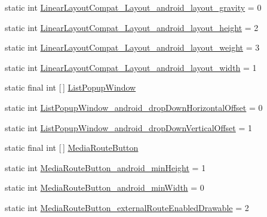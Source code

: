 \begin{DoxyCompactItemize}
\item 
static int \hyperlink{classandroid_1_1support_1_1v7_1_1mediarouter_1_1R_1_1styleable_aa6fdf2458c85c1826fa468547aaf9215}{Linear\+Layout\+Compat\+\_\+\+Layout\+\_\+android\+\_\+layout\+\_\+gravity} = 0
\item 
static int \hyperlink{classandroid_1_1support_1_1v7_1_1mediarouter_1_1R_1_1styleable_afc7e0bb6cbbe6db8125e2377fa0da82b}{Linear\+Layout\+Compat\+\_\+\+Layout\+\_\+android\+\_\+layout\+\_\+height} = 2
\item 
static int \hyperlink{classandroid_1_1support_1_1v7_1_1mediarouter_1_1R_1_1styleable_a08568351b29f3190bab90995aa954fef}{Linear\+Layout\+Compat\+\_\+\+Layout\+\_\+android\+\_\+layout\+\_\+weight} = 3
\item 
static int \hyperlink{classandroid_1_1support_1_1v7_1_1mediarouter_1_1R_1_1styleable_a50f6347a18dd6c05c35557a22815688a}{Linear\+Layout\+Compat\+\_\+\+Layout\+\_\+android\+\_\+layout\+\_\+width} = 1
\item 
static final int \mbox{[}$\,$\mbox{]} \hyperlink{classandroid_1_1support_1_1v7_1_1mediarouter_1_1R_1_1styleable_abd77b8b3a632f63ef1efadea7d411dd4}{List\+Popup\+Window}
\item 
static int \hyperlink{classandroid_1_1support_1_1v7_1_1mediarouter_1_1R_1_1styleable_aff37d4b141af98f69d0a815b8206f3a0}{List\+Popup\+Window\+\_\+android\+\_\+drop\+Down\+Horizontal\+Offset} = 0
\item 
static int \hyperlink{classandroid_1_1support_1_1v7_1_1mediarouter_1_1R_1_1styleable_a26f2cebc2eb4324dd371516539bed16b}{List\+Popup\+Window\+\_\+android\+\_\+drop\+Down\+Vertical\+Offset} = 1
\item 
static final int \mbox{[}$\,$\mbox{]} \hyperlink{classandroid_1_1support_1_1v7_1_1mediarouter_1_1R_1_1styleable_a3ffcf56e5764450d86df9877ffb66258}{Media\+Route\+Button}
\item 
static int \hyperlink{classandroid_1_1support_1_1v7_1_1mediarouter_1_1R_1_1styleable_ab98a55579c58d4c98bfd327310ce9a31}{Media\+Route\+Button\+\_\+android\+\_\+min\+Height} = 1
\item 
static int \hyperlink{classandroid_1_1support_1_1v7_1_1mediarouter_1_1R_1_1styleable_ab6856ae1a9a085cb912367dfb497084e}{Media\+Route\+Button\+\_\+android\+\_\+min\+Width} = 0
\item 
static int \hyperlink{classandroid_1_1support_1_1v7_1_1mediarouter_1_1R_1_1styleable_afdeb168461403af3e2f9cfe441938c4c}{Media\+Route\+Button\+\_\+external\+Route\+Enabled\+Drawable} = 2
\item 

\end{DoxyCompactItemize}
